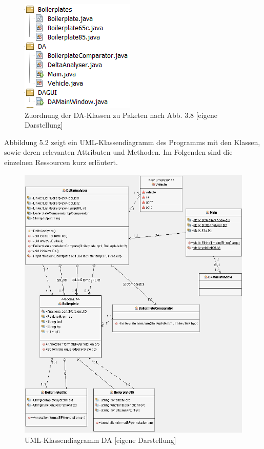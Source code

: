 \documentclass[12pt]{report}
\begin{document}
\begin{figure}[h!]
\begin{center}
\includegraphics[scale=1.0]{Bilder/DA-Pakete.png}
\caption{Zuordnung der DA-Klassen zu Paketen nach Abb. 3.8 [eigene Darstellung]}
\end{center}
\end{figure}

Abbildung 5.2 zeigt ein UML-Klassendiagramm des Programms mit den Klassen, sowie deren relevanten Attributen und Methoden. Im Folgenden sind die einzelnen Ressourcen kurz erläutert.

\begin{figure}[h!]
\begin{center}
\includegraphics[scale=0.635]{Bilder/da-klassen.png}
\caption{UML-Klassendiagramm DA [eigene Darstellung]}
\end{center}
\end{figure}
\end{document}
